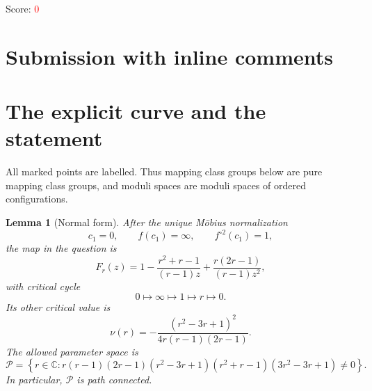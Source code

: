 \documentclass[11pt]{article}
\newcommand{\C}{\mathbb C}
\newcommand{\Par}{\mathcal P}
\newtheorem{lemma}[theorem]{Lemma}
\theoremstyle{definition}
\theoremstyle{remark}
\begin{document}
\noindent Score: \textcolor{red}{0}
\newpage
\section{Submission with inline comments}


\begin{abstract}
We describe a simple closed curve for which the Dehn twist itself,
not merely a proper power, preserves the deformation space in the
question and has an infinite orbit on its connected components.
The curve is first specified for one explicit normalized rational map
and is then transported to an arbitrary map in the family.
The proof uses an explicit Hurwitz covering and a free-group quotient
of the stabilizer of a component.  It does not assume that the
components of the deformation space are simply connected.
\end{abstract}

\section{The explicit curve and the statement}

All marked points are labelled.  Thus mapping class groups below are
pure mapping class groups, and moduli spaces are moduli spaces of
ordered configurations.

\begin{lemma}[Normal form]\label{lem:normal}
After the unique M\"obius normalization
\[
c_1=0,\qquad f(c_1)=\infty,\qquad f^{\circ 2}(c_1)=1,
\]
the map in the question is
\begin{equation}\label{eq:normal}
F_r(z)=
1-\frac{r^2+r-1}{(r-1)z}
+\frac{r(2r-1)}{(r-1)z^2},
\end{equation}
with critical cycle
\[
0\longmapsto\infty\longmapsto1\longmapsto r\longmapsto0.
\]
Its other critical value is
\begin{equation}\label{eq:nu}
\nu(r)=
-\frac{(r^2-3r+1)^2}{4r(r-1)(2r-1)}.
\end{equation}
The allowed parameter space is
\begin{equation}\label{eq:parameter}
\Par=
\left\{
r\in\C:
r(r-1)(2r-1)
(r^2-3r+1)(r^2+r-1)(3r^2-3r+1)\ne0
\right\}.
\end{equation}
In particular, $\Par$ is path connected.
\end{lemma}
\end{document}
